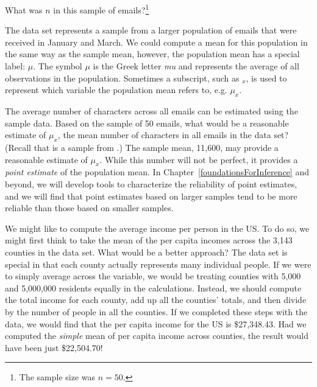 \begin{exercise}
What was $n$ in this sample of emails?\footnote{The sample size was $n=50$.}
\end{exercise}

The  data set represents a sample from a larger population of emails that were received in January and March. We could compute a mean for this population in the same way as the sample mean, however, the population mean has a special label: $\mu$.  The symbol $\mu$ is the Greek letter \emph{mu} and represents the average of all observations in the population. Sometimes a subscript, such as $_x$, is used to represent which variable the population mean refers to, e.g. $\mu_x$.

\begin{example}{The average number of characters across all emails can be estimated using the sample data. Based on the sample of 50 emails, what would be a reasonable estimate of $\mu_x$, the mean number of characters in all emails in the  data set? (Recall that  is a sample from .)}
The sample mean, 11,600, may provide a reasonable estimate of $\mu_x$. While this number will not be perfect, it provides a \emph{point estimate} of the population mean. In Chapter~\ref{foundationsForInference} and beyond, we will develop tools to characterize the reliability of point estimates, and we will find that point estimates based on larger samples tend to be more reliable than those based on smaller samples.
\end{example}

\begin{example}{We might like to compute the average income per person in the US. To do so, we might first think to take the mean of the per capita incomes across the 3,143 counties in the  data set. What would be a better approach?} \label{wtdMeanOfIncome}
The  data set is special in that each county actually represents many individual people. If we were to simply average across the  variable, we would be treating counties with 5,000 and 5,000,000 residents equally in the calculations. Instead, we should compute the total income for each county, add up all the counties' totals, and then divide by the number of people in all the counties. If we completed these steps with the  data, we would find that the per capita income for the US is \$27,348.43. Had we computed the \emph{simple} mean of per capita income across counties, the result would have been just \$22,504.70!
\end{example}

